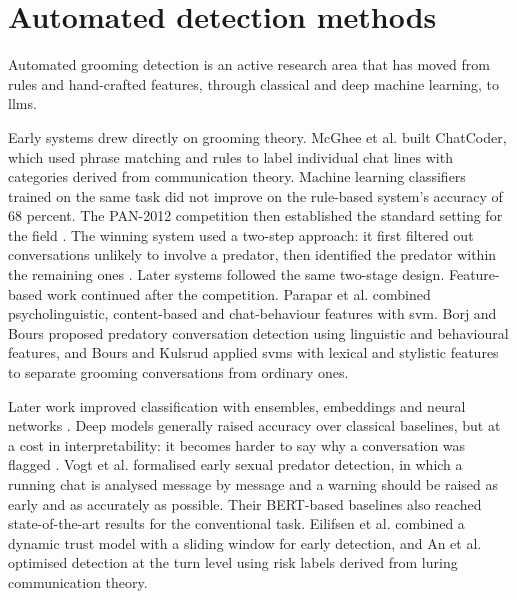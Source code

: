 \section{Automated detection methods}
Automated grooming detection is an active research area that has moved from rules and hand-crafted features, through classical and deep machine learning, to \gls{llm}s. 

Early systems drew directly on grooming theory. McGhee et al. \cite{mcghee2011} built ChatCoder, which used phrase matching and rules to label individual chat lines with categories derived from communication theory. Machine learning classifiers trained on the same task did not improve on the rule-based system's accuracy of 68 percent. The PAN-2012 competition then established the standard setting for the field \cite{inches2012}. The winning system used a two-step approach: it first filtered out conversations unlikely to involve a predator, then identified the predator within the remaining ones \cite{villatoro2012}. Later systems followed the same two-stage design. Feature-based work continued after the competition. Parapar et al. \cite{parapar2014} combined psycholinguistic, content-based and chat-behaviour features with \gls{svm}. Borj and Bours \cite{borjbours2019} proposed predatory conversation detection using linguistic and behavioural features, and Bours and Kulsrud \cite{bours2019} applied \gls{svm}s with lexical and stylistic features to separate grooming conversations from ordinary ones.

Later work improved classification with ensembles, embeddings and neural networks \cite{fauzi2020, borj2021, borj2023}. Deep models generally raised accuracy over classical baselines, but at a cost in interpretability: it becomes harder to say why a conversation was flagged \cite{karthikeyan2023}.
Vogt et al. \cite{vogt2021} formalised early sexual predator detection, in which a running chat is analysed message by message and a warning should be raised as early and as accurately as possible. Their BERT-based baselines also reached state-of-the-art results for the conventional task. Eilifsen et al. \cite{eilifsen2023} combined a dynamic trust model with a sliding window for early detection, and An et al. \cite{an2025} optimised detection at the turn level using risk labels derived from luring communication theory.






